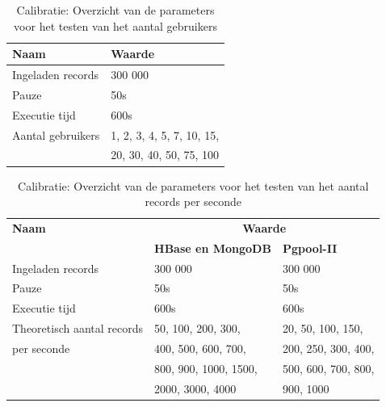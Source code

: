 \begin{table}[htb!]
	\centering
	\begin{tabular}{l| l}
	\textbf{Naam} & \textbf{Waarde}  \\
	\hline
	Ingeladen records  & 300 000 \\
	Pauze & 50s \\
	Executie tijd & 600s \\
	Aantal gebruikers & 1, 2, 3, 4, 5, 7, 10, 15, \\
	& 20, 30, 40, 50, 75, 100\\
	\end{tabular}
	\caption{Calibratie: Overzicht van de parameters voor het testen van het aantal gebruikers}
	\label{table:calibratiegebruikers}
\end{table}

\begin{table}[htb!]
	\centering
	\begin{tabular}{l| l l }
		\textbf{Naam} & \multicolumn{2}{c}{\textbf{Waarde}}  \\
		
		& \textbf{HBase en MongoDB} & \textbf{Pgpool-II} \\
		\hline
		Ingeladen records  & 300 000 & 300 000 \\
		Pauze & 50s & 50s \\
		Executie tijd & 600s & 600s\\
		Theoretisch aantal records  & 50, 100, 200, 300,   & 20, 50, 100, 150,   \\
		per seconde & 400, 500, 600, 700, & 200, 250, 300, 400,  \\
		& 800, 900, 1000, 1500,  & 500, 600, 700, 800,  \\
		& 2000, 3000, 4000 &  900, 1000 \\
	\end{tabular}
	\caption{Calibratie: Overzicht van de parameters voor het testen van het aantal records per seconde}
	\label{table:calibratiequeriesperseconde}
\end{table}

